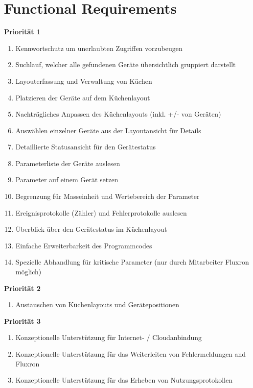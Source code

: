 
\section{Functional Requirements}
\label{sec:Functional Requirements}

\textbf{Priorität 1}
\begin{enumerate}
		\item Kennwortschutz um unerlaubten Zugriffen vorzubeugen
        \item Suchlauf, welcher alle gefundenen Geräte übersichtlich gruppiert darstellt
        \item Layouterfassung und Verwaltung von Küchen
        \item Platzieren der Geräte auf dem Küchenlayout
        \item Nachträgliches Anpassen des Küchenlayouts (inkl. +/- von Geräten)
        \item Auswählen einzelner Geräte aus der Layoutansicht für Details
        \item Detaillierte Statusansicht für den Gerätestatus
        \item Parameterliste der Geräte auslesen
		\item Parameter auf einem Gerät setzen
		\item Begrenzung für Masseinheit und Wertebereich der Parameter
        \item Ereignisprotokolle (Zähler) und Fehlerprotokolle auslesen
        \item Überblick über den Gerätestatus im Küchenlayout
        \item Einfache Erweiterbarkeit des Programmcodes
        \item Spezielle Abhandlung für kritische Parameter (nur durch Mitarbeiter Fluxron möglich)
	\end{enumerate}
\textbf{Priorität 2}
	\begin{enumerate}[resume]
        \item Austauschen von Küchenlayouts und Gerätepositionen
	\end{enumerate}
\textbf{Priorität 3}
	\begin{enumerate}[resume]
		\item Konzeptionelle Unterstützung für Internet- / Cloudanbindung
        \item Konzeptionelle Unterstützung für das Weiterleiten von Fehlermeldungen and Fluxron
        \item Konzeptionelle Unterstützung für das Erheben von Nutzungsprotokollen
\end{enumerate}
